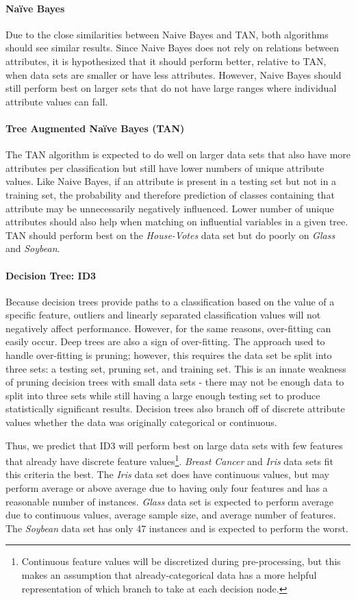 \paragraph{Na\"{i}ve Bayes}
Due to the close similarities between Naive Bayes and TAN, both algorithms should see similar results. 
Since Naive Bayes does not rely on relations between attributes, it is hypothesized that it should perform better, relative to TAN, when data sets are smaller or have less attributes. 
However, Naive Bayes should still perform best on larger sets that do not have large ranges where individual attribute values can fall. 

\paragraph{Tree Augmented Na\"{i}ve Bayes (TAN)}
The TAN algorithm is expected to do well on larger data sets that also have more attributes per classification but still have lower numbers of unique attribute values.  
Like Naive Bayes, if an attribute is present in a testing set but not in a training set, the probability and therefore prediction of classes containing that attribute may be unnecessarily negatively influenced. Lower number of unique attributes should also help when matching on influential variables in a given tree.  
TAN should perform best on the \textit{House-Votes} data set but do poorly on \textit{Glass} and \textit{Soybean}. 

\paragraph{Decision Tree: ID3}
Because decision trees provide paths to a classification based on the value of a specific feature, outliers and linearly separated classification values will not negatively affect performance.  
However, for the same reasons, over-fitting can easily occur.
Deep trees are also a sign of over-fitting.
The approach used to handle over-fitting is pruning; however, this requires the data set be split into three sets: a testing set, pruning set, and training set.
This is an innate weakness of pruning decision trees with small data sets - there may not be enough data to split into three sets while still having a large enough testing set to produce statistically significant results.
Decision trees also branch off of discrete attribute values whether the data was originally categorical or continuous. 

Thus, we predict that ID3 will perform best on large data sets with few features that already have discrete feature values\footnote{Continuous feature values will be discretized during pre-processing, but this makes an assumption that already-categorical data has a more helpful representation of which branch to take at each decision node.}. 
\textit{Breast Cancer} and \textit{Iris} data sets fit this criteria the best.
The \textit{Iris} data set does have continuous values, but may perform average or above average due to having only four features and has a reasonable number of instances.
\textit{Glass} data set is expected to perform average due to continuous values, average sample size, and average number of features.
The \textit{Soybean} data set has only 47 instances and is expected to perform the worst. 